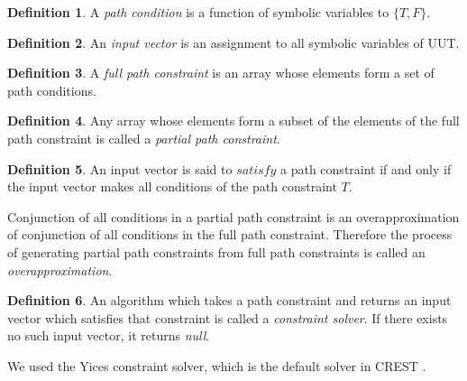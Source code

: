 \documentclass[EPiCempty]{easychair}
\begin{document}
\theoremstyle{definition}
\newtheorem{definition}{Definition}

\theoremstyle{plain}
\newtheorem{axiom}{Axiom}
\newtheorem{theorem}{Theorem}
\begin{definition}
A \emph{path condition} is a function of symbolic variables to $\lbrace T, F \rbrace$.
\end{definition}

\begin{definition}
An \emph{input vector} is an assignment to all symbolic variables of UUT.
\end{definition}

\begin{definition}
A \emph{full path constraint} is an array whose elements form a set of path conditions. 
\end{definition}

\begin{definition}
Any array whose elements form a subset of the elements of the full path constraint is called a \emph{partial path constraint}.
\end{definition}

\begin{definition}
An input vector is said to $satisfy$ a path constraint if and only if the input vector makes all conditions of the path constraint $T$.
\end{definition}

Conjunction of all conditions in a partial path constraint is an overapproximation of conjunction of all conditions in the full path constraint. Therefore the process of generating partial path constraints from full path constraints is called an \emph{overapproximation}.

\begin{definition}
An algorithm which takes a path constraint and returns an input vector which satisfies that constraint is called a \emph{constraint solver}. If there exists no such input vector, it returns \emph{null}.
\end{definition}

We used the Yices constraint solver, which is the default solver in CREST \cite{Yices, Burnim:2008:HSD:1642931.1642995}.

%
\end{document}
